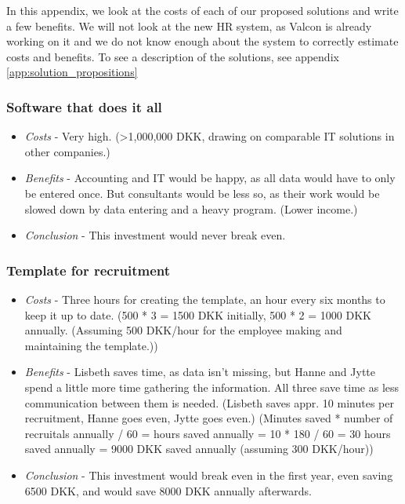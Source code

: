 \label{app:cost_benefit_analysis}
In this appendix, we look at the costs of each of our proposed solutions and write a few benefits.
We will not look at the new HR system, as Valcon is already working on it and we do not know enough about the system to correctly estimate costs and benefits. 
To see a description of the solutions, see appendix \ref{app:solution_propositions}

\subsubsection{Software that does it all}
\begin{itemize}
\item \emph{Costs} - Very high. (\textgreater 1,000,000 DKK, drawing on comparable IT solutions in other companies.)
\item \emph{Benefits} - Accounting and IT would be happy, as all data would have to only be entered once. But consultants would be less so, as their work would be slowed down by data entering and a heavy program. (Lower income.)
\item \emph{Conclusion} - This investment would never break even.
\end{itemize}

\subsubsection{Template for recruitment}
\begin{itemize}
\item \emph{Costs} - Three hours for creating the template, an hour every six months to keep it up to date. (500 * 3 = 1500 DKK initially, 500 * 2 = 1000 DKK annually. (Assuming 500 DKK/hour for the employee making and maintaining the template.))
\item \emph{Benefits} - Lisbeth saves time, as data isn't missing, but Hanne and Jytte spend a little more time gathering the information. All three save time as less communication between them is needed. (Lisbeth saves appr. 10 minutes per recruitment, Hanne goes even, Jytte goes even.) (Minutes saved * number of recruitals annually / 60 = hours saved annually = 10 * 180 / 60 = 30 hours saved annually = 9000 DKK saved annually (assuming 300 DKK/hour))
\item \emph{Conclusion} - This investment would break even in the first year, even saving 6500 DKK, and would save 8000 DKK annually afterwards.
\end{itemize}

